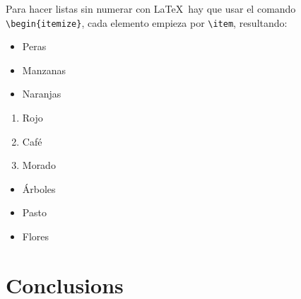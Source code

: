 	Para hacer listas sin numerar con \LaTeX\ hay que usar el comando \texttt{\textbackslash begin\{itemize\}}, cada elemento empieza por \texttt{\textbackslash item}, resultando:

	\begin{multicols}{3}
		\begin{itemize}[label={--}]
			\item Peras
			\item Manzanas
			\item Naranjas
		\end{itemize}

		\begin{enumerate}[label={*}]
			\item Rojo
			\item Café
			\item Morado
		\end{enumerate}

		\begin{itemize}
			\item Árboles
			\item Pasto
			\item Flores
		\end{itemize}
	\end{multicols}


\chapter{Conclusions}

\lipsum[1] \\

\lipsum[2]





